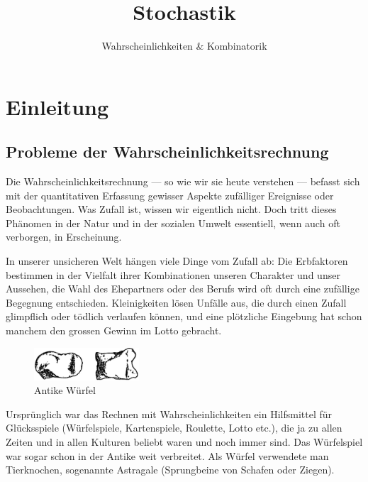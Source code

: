 \documentclass[%
11pt,%
twoside,%
titlepage,%
german,%
headsepline%
]{scrartcl}
\title{Stochastik}
\subtitle{Wahrscheinlichkeiten \& Kombinatorik}
\author{}
\date{}
\begin{document}
\maketitle
\thispagestyle{empty}
\cleardoublepage
\tableofcontents
\cleardoublepage

\pagestyle{headings}

\section{Einleitung}

\subsection{Probleme der Wahrscheinlichkeitsrechnung}

Die Wahrscheinlichkeitsrechnung --- so wie wir sie heute verstehen --- befasst sich mit der quantitativen Erfassung gewisser Aspekte zufälliger Ereignisse oder Beobachtungen. Was Zufall ist, wissen wir eigentlich nicht. Doch tritt dieses Phänomen in der Natur und in der sozialen Umwelt essentiell, wenn auch oft verborgen, in Erscheinung.

In unserer unsicheren Welt hängen viele Dinge vom Zufall ab: Die Erbfaktoren bestimmen in der Vielfalt ihrer Kombinationen unseren Charakter und unser Aussehen, die Wahl des Ehepartners oder des Berufs wird oft durch eine zufällige Begegnung entschieden. Kleinigkeiten lösen Unfälle aus, die durch einen Zufall glimpflich oder tödlich verlaufen können, und eine plötzliche Eingebung hat schon manchem den grossen Gewinn im Lotto gebracht.

\begin{figure}
  \centering
\includegraphics[width=0.35\textwidth]{pictures/tierknochen}
\caption{Antike Würfel}
\end{figure}
Ursprünglich war das Rechnen mit Wahrscheinlichkeiten ein Hilfsmittel für Glücksspiele (Würfelspiele, Kartenspiele, Roulette, Lotto etc.), die ja zu allen Zeiten und in allen Kulturen beliebt waren und noch immer sind. Das Würfelspiel war sogar schon in der Antike weit verbreitet. Als Würfel verwendete man Tierknochen, sogenannte Astragale (Sprungbeine von Schafen oder Ziegen).
\end{document}

